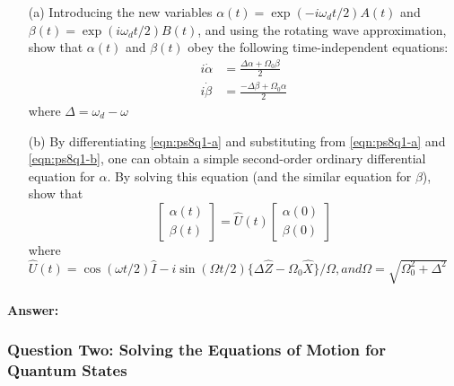 \documentclass[reprint, amsmath,amssymb, aps]{revtex4-2}
\begin{document}
                \begin{itemize}
                    \item[(a)] Introducing the new variables $\alpha(t) =\exp(-i\omega_dt/2)A(t)$  and$\beta(t) = \exp(i\omega_dt/2)B(t)$, and using the rotating wave approximation, show that $\alpha(t)$ and $\beta(t)$ obey the following time-independent equations:
                        \begin{align*}
                            i\dot{\alpha} &= \frac{\Delta \alpha + \Omega_0 \beta}{2} \tag{A}\label{eqn:ps8q1-a}\\
                            i\dot{\beta} &= \frac{-\Delta \beta + \Omega_0 \alpha}{2} \tag{B}\label{eqn:ps8q1-b}
                        \end{align*}
                    where $\Delta = \omega_d - \omega$
                    \item[(b)] By differentiating \eqref{eqn:ps8q1-a} and substituting from \eqref{eqn:ps8q1-a} and \eqref{eqn:ps8q1-b}, one can obtain a simple second-order ordinary differential equation for $\alpha$. By solving this equation (and the similar equation for $\beta$), show that
                        \begin{equation*}
                            \begin{bmatrix} \alpha(t)\\\beta(t)\end{bmatrix} = \hat{U}(t)\begin{bmatrix}\alpha(0)\\ \beta(0)\end{bmatrix}
                        \end{equation*}
                    where $\hat{U}(t) = \cos(\omega t/2)\hat{I} - i\sin(\Omega t/2)\{\Delta\hat{Z} - \Omega_0\hat{X}\}/\Omega, and \Omega = \sqrt{\Omega_0^2+\Delta^2}$
                \end{itemize}

                \begin{mdframed}
                \paragraph{Answer:}

                
                \end{mdframed}

            \subsubsection{Question Two: Solving the Equations of Motion for Quantum States}
\end{document}

